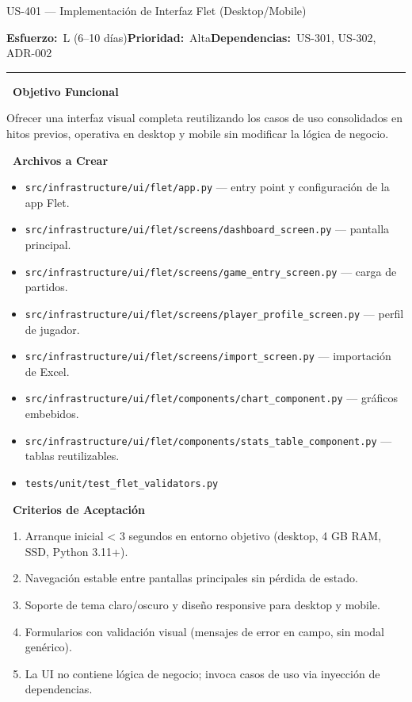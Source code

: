 \documentclass[11pt,a4paper]{article}
\newcommand{\fpath}[1]{\texttt{\small #1}}
\newcommand{\usfield}[2][\;]{%
  \par\vspace{5pt}%
  {\small\textbf{\textcolor{primary}{#2}}}\par\vspace{2pt}%
}
\newcommand{\usmeta}[3]{%
  \vspace{2pt}%
  {\small\textcolor{secondary}{%
    \textbf{Esfuerzo:}~#1\quad\textbf{Prioridad:}~#2\quad\textbf{Dependencias:}~#3%
  }}%
  \par\vspace{4pt}%
  \textcolor{bordergray}{\rule{\linewidth}{0.4pt}}\par\vspace{4pt}%
}
\begin{document}
\begin{uscard}{US-401 — Implementación de Interfaz Flet (Desktop/Mobile)}

\usmeta{L (6–10 días)}{Alta}{US-301, US-302, ADR-002}

\usfield{\faAlignLeft\ Objetivo Funcional}
Ofrecer una interfaz visual completa reutilizando los casos de uso consolidados en hitos previos, operativa en desktop y mobile sin modificar la lógica de negocio.

\usfield{\faFolderOpen\ Archivos a Crear}
\begin{itemize}[nosep, leftmargin=1.6em]
  \item \fpath{src/infrastructure/ui/flet/app.py} — entry point y configuración de la app Flet.
  \item \fpath{src/infrastructure/ui/flet/screens/dashboard\_screen.py} — pantalla principal.
  \item \fpath{src/infrastructure/ui/flet/screens/game\_entry\_screen.py} — carga de partidos.
  \item \fpath{src/infrastructure/ui/flet/screens/player\_profile\_screen.py} — perfil de jugador.
  \item \fpath{src/infrastructure/ui/flet/screens/import\_screen.py} — importación de Excel.
  \item \fpath{src/infrastructure/ui/flet/components/chart\_component.py} — gráficos embebidos.
  \item \fpath{src/infrastructure/ui/flet/components/stats\_table\_component.py} — tablas reutilizables.
  \item \fpath{tests/unit/test\_flet\_validators.py}
\end{itemize}

\usfield{\faCheckCircle\ Criterios de Aceptación}
\begin{enumerate}[label=\textcolor{accent}{\textbf{AC\arabic*.}}, nosep, leftmargin=2.2em]
  \item Arranque inicial < 3 segundos en entorno objetivo (desktop, 4 GB RAM, SSD, Python 3.11+).
  \item Navegación estable entre pantallas principales sin pérdida de estado.
  \item Soporte de tema claro/oscuro y diseño responsive para desktop y mobile.
  \item Formularios con validación visual (mensajes de error en campo, sin modal genérico).
  \item La UI no contiene lógica de negocio; invoca casos de uso via inyección de dependencias.
\end{enumerate}


\end{uscard}
\end{document}
